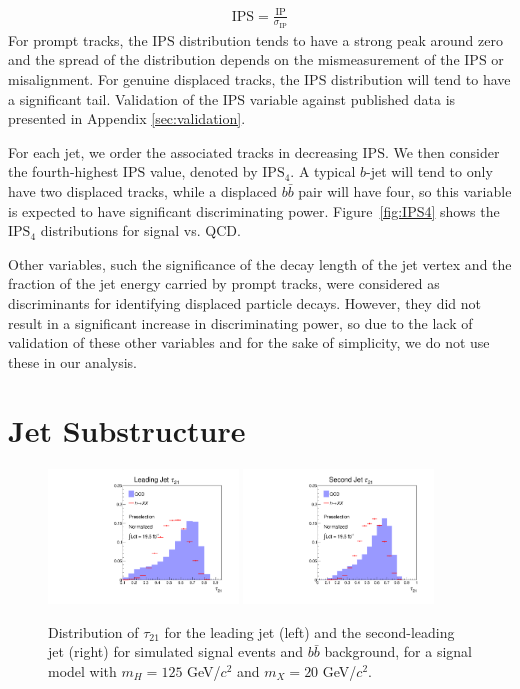 \documentclass{JHEP3}
\newcommand{\IP}{\textrm{IP}}
\newcommand{\IPS}{\textrm{IPS}}
\begin{document}
\begin{align}
\IPS=\frac{\IP}{\sigma_{\IP}}
\end{align}
For prompt tracks,  the $\IPS$ distribution tends to have a strong peak around zero and the
spread of the distribution depends on the mismeasurement of the $\IPS$ or misalignment. 
For genuine displaced tracks, the $\IPS$ distribution will tend to have a
significant tail. Validation of the $\IPS$ variable against published data is presented in Appendix \ref{sec:validation}.


For each jet, we order the associated tracks in decreasing $\IPS$. We then consider the
fourth-highest $\IPS$ value, denoted by $\IPS_{4}$. A typical $b$-jet will tend to only have two displaced
tracks, while a displaced $b\bar{b}$ pair will have four, so this variable is expected to have significant
discriminating power. Figure~\ref{fig:IPS4} shows the $\IPS_{4}$ distributions for signal vs. QCD.

Other variables, such the significance of the decay length of the jet vertex and the fraction of the jet energy
carried by prompt tracks, were considered as discriminants for identifying displaced particle decays.
However, they did not result in a significant increase in discriminating power, so due to the lack of
validation of these other variables and for the sake of simplicity,  we do not use these in our analysis.

\section{Jet Substructure}
\label{sec:substructure}

\begin{figure}[ht]
\centering
\includegraphics[width=0.45\textwidth]{pre_t21_1.pdf}
\includegraphics[width=0.45\textwidth]{pre_t21_2.pdf}
\caption{Distribution of $\tau_{21}$ for the leading jet (left) and the second-leading jet (right) for
  simulated signal events and $b\bar{b}$ background, for a signal model with $m_H = 125$ GeV/$c^2$ and $m_X =
  20$ GeV/$c^2$.}
\label{fig:tau21}
\end{figure}
\end{document}
